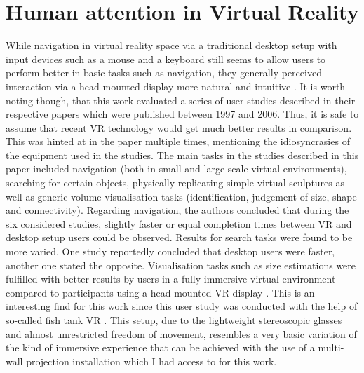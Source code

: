 \section{Human attention in Virtual Reality}
\label{sec:human_attention_in_virtual_reality}

While navigation in virtual reality space via a traditional desktop setup with input devices such as a mouse and a keyboard still seems to allow users to perform better in basic tasks such as navigation, they generally perceived interaction via a head-mounted display more natural and intuitive \cite{santos2009head}. It is worth noting though, that this work evaluated a series of user studies described in their respective papers which were published between 1997 and 2006. Thus, it is safe to assume that recent VR technology would get much better results in comparison. This was hinted at in the paper multiple times, mentioning the idiosyncrasies of the equipment used in the studies.
The main tasks in the studies described in this paper included navigation (both in small and large-scale virtual environments), searching for certain objects, physically replicating simple virtual sculptures as well as generic volume visualisation tasks (identification, judgement of size, shape and connectivity). Regarding navigation, the authors concluded that during the six considered studies, slightly faster or equal completion times between VR and desktop setup users could be observed. Results for search tasks were found to be more varied. One study reportedly concluded that desktop users were faster, another one stated the opposite. Visualisation tasks such as size estimations were fulfilled with better results by users in a fully immersive virtual environment compared to participants using a head mounted VR display \cite{qi2006comparison}. This is an interesting find for this work since this user study was conducted with the help of so-called fish tank VR \cite{ware1993fish}. This setup, due to the lightweight stereoscopic glasses and almost unrestricted freedom of movement, resembles a very basic variation of the kind of immersive experience that can be achieved with the use of a multi-wall projection installation which I had access to for this work.


